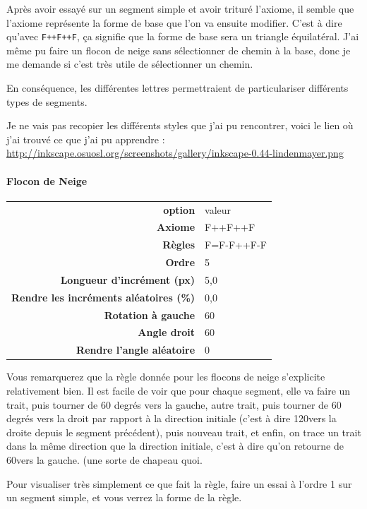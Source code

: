 \documentclass[a4paper,twoside]{article}
\begin{document}
\begin{remarque}
Après avoir essayé sur un segment simple et avoir trituré l'axiome, il semble que l'axiome représente la forme de base que l'on va ensuite modifier. C'est à dire qu'avec \texttt{F++F++F}, ça signifie que la forme de base sera un triangle équilatéral. J'ai même pu faire un flocon de neige sans sélectionner de chemin à la base, donc je me demande si c'est très utile de sélectionner un chemin.

En conséquence, les différentes lettres permettraient de particulariser différents types de segments.
\end{remarque}

Je ne vais pas recopier les différents styles que j'ai pu rencontrer, voici le lien où j'ai trouvé ce que j'ai pu apprendre :
\url{http://inkscape.osuosl.org/screenshots/gallery/inkscape-0.44-lindenmayer.png}

\paragraph{Flocon de Neige}
\begin{tabular}{>{\bfseries}r<{}@{ : }p{6cm}}
option &	valeur\\
Axiome & F++F++F\\
Règles & F=F-F++F-F\\
Ordre & 5\\
Longueur d'incrément (px) & 5,0\\
Rendre les incréments aléatoires (\%) & 0,0\\
Rotation à gauche & 60\\
Angle droit & 60 \\
Rendre l'angle aléatoire & 0
\end{tabular}

\begin{remarque}
Vous remarquerez que la règle donnée pour les flocons de neige s'explicite relativement bien. Il est facile de voir que pour chaque segment, elle va faire un trait, puis tourner de 60 degrés vers la gauche, autre trait, puis tourner de 60 degrés vers la droit par rapport à la direction initiale (c'est à dire 120\degre vers la droite depuis le segment précédent), puis nouveau trait, et enfin, on trace un trait dans la même direction que la direction initiale, c'est à dire qu'on retourne de 60\degre vers la gauche. (une sorte de chapeau quoi.

Pour visualiser très simplement ce que fait la règle, faire un essai à l'ordre 1 sur un segment simple, et vous verrez la forme de la règle.
\end{remarque}
\end{document}
